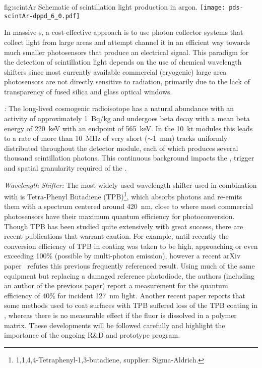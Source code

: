 \begin{dunefigure}{fig:scintAr}
{Schematic of scintillation light production in argon.}
\texttt{[image: pds-scintAr-dppd\_6\_0.pdf]}
\end{dunefigure}

In massive \lartpc{}s, a cost-effective approach is to use photon collector systems that collect light from large areas and attempt channel it in an efficient way towards much smaller photosensors that produce an electrical signal.
This paradigm for the detection of \lar scintillation light depends on the use of chemical wavelength shifters since most currently available commercial (cryogenic) large area photosensors are not directly sensitive to  radiation, primarily due to the lack of transparency of fused silica and glass optical windows. 

\emph{:}  The long-lived cosmogenic radioisotope  has a natural abundance with an activity of approximately \SI{1}{Bq/kg} and
undergoes beta decay with a mean beta energy of \SI{220}{keV} with an endpoint of \SI{565}{keV}. In the \SI{10}{kt}  modules this leads to a rate of more than \SI{10}{MHz} of very short ($\sim$\SI{1}{mm}) tracks uniformly distributed throughout the detector module, each of which produces several thousand  scintillation photons. This continuous background impacts the , trigger and spatial granularity required of the .

\emph{Wavelength Shifter:} The most widely used wavelength shifter used in combination with \lar is Tetra-Phenyl Butadiene (TPB)\footnote{1,1,4,4-Tetraphenyl-1,3-butadiene, supplier: Sigma-Aldrich\textregistered.}, which absorbs  photons and re-emits them with a spectrum centered around \SI{420}{nm}, close to where most commercial photosensors have their maximum quantum efficiency for photoconversion. 
Though TPB has been studied quite extensively with great success, there are recent publications that warrant caution. For example, until recently the conversion efficiency of TPB in coating was taken to be high, approaching or even exceeding \num{100}\% (possible by multi-photon emission), however a recent arXiv paper~\cite{Benson:2017vbw} refutes this previous frequently referenced result. Using much of the same equipment but replacing a damaged reference photodiode, the authors (including an author of the previous paper) report a measurement for the quantum efficiency of \num{40}\% for incident \SI{127}{nm} light. 
Another recent paper\cite{Asaadi:2018ixs} reports that some methods used to coat surfaces with TPB suffered loss of the TPB coating in \lar, whereas there is no measurable effect if the fluor is dissolved in a polymer matrix. These developments will be followed carefully and highlight the importance of the ongoing R\&D and prototype program.


